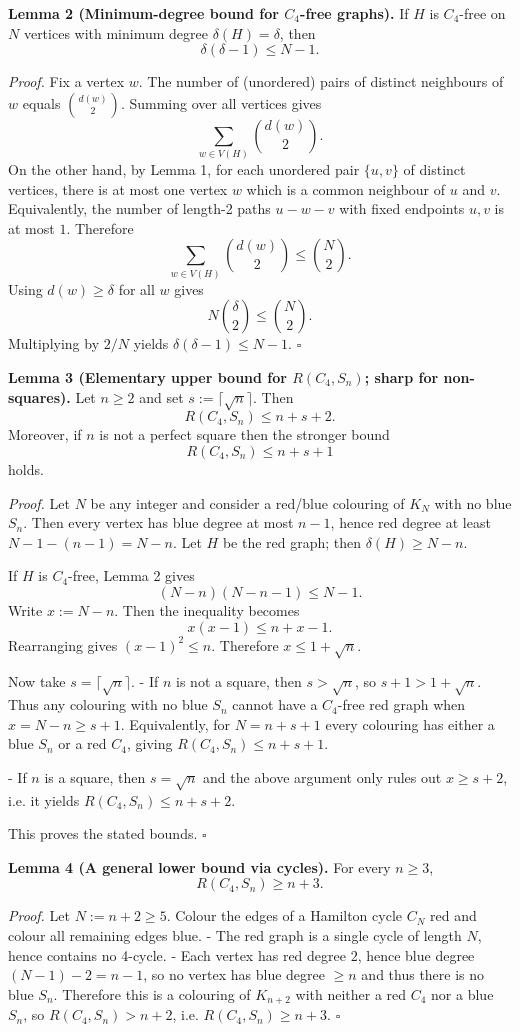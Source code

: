 \textbf{Lemma 2 (Minimum-degree bound for $C_4$-free graphs).}
If $H$ is $C_4$-free on $N$ vertices with minimum degree $\delta(H)=\delta$, then
\[
\delta(\delta-1)\le N-1.
\]

\emph{Proof.}
Fix a vertex $w$. The number of (unordered) pairs of distinct neighbours of $w$ equals $\binom{d(w)}{2}$. Summing over all vertices gives
\[
\sum_{w\in V(H)} \binom{d(w)}{2}.
\]
On the other hand, by Lemma 1, for each unordered pair $\{u,v\}$ of distinct vertices, there is at most one vertex $w$ which is a common neighbour of $u$ and $v$. Equivalently, the number of length-2 paths $u-w-v$ with fixed endpoints $u,v$ is at most $1$. Therefore
\[
\sum_{w\in V(H)} \binom{d(w)}{2} \le \binom{N}{2}.
\]
Using $d(w)\ge \delta$ for all $w$ gives
\[
N\binom{\delta}{2} \le \binom{N}{2}.
\]
Multiplying by $2/N$ yields $\delta(\delta-1)\le N-1$. $\square$

\textbf{Lemma 3 (Elementary upper bound for $R(C_4,S_n)$; sharp for non-squares).}
Let $n\ge 2$ and set $s:=\lceil\sqrt{n}\rceil$. Then
\[
R(C_4,S_n)\le n+s+2.
\]
Moreover, if $n$ is not a perfect square then the stronger bound
\[
R(C_4,S_n)\le n+s+1
\]
holds.

\emph{Proof.}
Let $N$ be any integer and consider a red/blue colouring of $K_N$ with no blue $S_n$. Then every vertex has blue degree at most $n-1$, hence red degree at least $N-1-(n-1)=N-n$. Let $H$ be the red graph; then $\delta(H)\ge N-n$.

If $H$ is $C_4$-free, Lemma 2 gives
\[
(N-n)(N-n-1) \le N-1.
\]
Write $x:=N-n$. Then the inequality becomes
\[
x(x-1) \le n+x-1.
\]
Rearranging gives $(x-1)^2\le n$. Therefore $x\le 1+\sqrt{n}$.

Now take $s=\lceil\sqrt{n}\rceil$.
- If $n$ is not a square, then $s>\sqrt{n}$, so $s+1>1+\sqrt{n}$. Thus any colouring with no blue $S_n$ cannot have a $C_4$-free red graph when $x=N-n\ge s+1$. Equivalently, for $N=n+s+1$ every colouring has either a blue $S_n$ or a red $C_4$, giving $R(C_4,S_n)\le n+s+1$.

- If $n$ is a square, then $s=\sqrt n$ and the above argument only rules out $x\ge s+2$, i.e. it yields $R(C_4,S_n)\le n+s+2$.

This proves the stated bounds. $\square$

\textbf{Lemma 4 (A general lower bound via cycles).}
For every $n\ge 3$,
\[
R(C_4,S_n)\ge n+3.
\]

\emph{Proof.}
Let $N:=n+2\ge 5$. Colour the edges of a Hamilton cycle $C_N$ red and colour all remaining edges blue.
- The red graph is a single cycle of length $N$, hence contains no 4-cycle.
- Each vertex has red degree $2$, hence blue degree $(N-1)-2 = n-1$, so no vertex has blue degree $\ge n$ and thus there is no blue $S_n$.
Therefore this is a colouring of $K_{n+2}$ with neither a red $C_4$ nor a blue $S_n$, so $R(C_4,S_n)>n+2$, i.e. $R(C_4,S_n)\ge n+3$. $\square$

